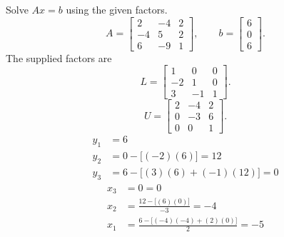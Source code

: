 \goal Solve $Ax=b$ using the given factors.
\[A=\left[\begin{matrix}2 & -4 & 2\\-4 & 5 & 2\\6 & -9 & 1\end{matrix}\right],\qquad b=\left[\begin{matrix}6\\0\\6\end{matrix}\right].\]
The supplied factors are
\[L=\left[\begin{matrix}1 & 0 & 0\\-2 & 1 & 0\\3 & -1 & 1\end{matrix}\right].\]
\[U=\left[\begin{matrix}2 & -4 & 2\\0 & -3 & 6\\0 & 0 & 1\end{matrix}\right].\]
\begin{align*}y_{1}&=6\\
y_{2}&=0-\bigl[(-2)(6)\bigr]=12\\
y_{3}&=6-\bigl[(3)(6)+(-1)(12)\bigr]=0\end{align*}
\begin{align*}x_{3}&=0=0\\
x_{2}&=\frac{12-\bigl[(6)(0)\bigr]}{-3}=-4\\
x_{1}&=\frac{6-\bigl[(-4)(-4)+(2)(0)\bigr]}{2}=-5\end{align*}

